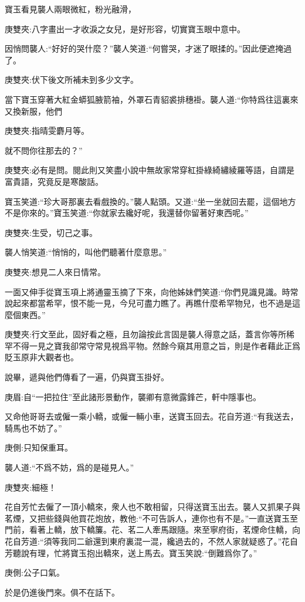 \begin{parag}
    寶玉看見襲人兩眼微紅，粉光融滑，\begin{note}庚雙夾:八字畫出一才收淚之女兒，是好形容，切實寶玉眼中意中。\end{note}因悄問襲人:“好好的哭什麼？”襲人笑道:“何嘗哭，才迷了眼揉的。”因此便遮掩過了。\begin{note}庚雙夾:伏下後文所補未到多少文字。\end{note}當下寶玉穿著大紅金蟒狐腋箭袖，外罩石青貂裘排穗褂。襲人道:“你特爲往這裏來又換新服，他們\begin{note}庚雙夾:指晴雯麝月等。\end{note}就不問你往那去的？”\begin{note}庚雙夾:必有是問。閱此則又笑盡小說中無故家常穿紅掛綠綺繡綾羅等語，自謂是富貴語，究竟反是寒酸話。\end{note}寶玉笑道:“珍大哥那裏去看戲換的。”襲人點頭。又道:“坐一坐就回去罷，這個地方不是你來的。”寶玉笑道:“你就家去纔好呢，我還替你留著好東西呢。”\begin{note}庚雙夾:生受，切己之事。\end{note}襲人悄笑道:“悄悄的，叫他們聽著什麼意思。”\begin{note}庚雙夾:想見二人來日情常。\end{note}一面又伸手從寶玉項上將通靈玉摘了下來，向他姊妹們笑道:“你們見識見識。時常說起來都當希罕，恨不能一見，今兒可盡力瞧了。再瞧什麼希罕物兒，也不過是這麼個東西。”\begin{note}庚雙夾:行文至此，固好看之極，且勿論按此言固是襲人得意之話，蓋言你等所稀罕不得一見之寶我卻常守常見視爲平物。然餘今窺其用意之旨，則是作者藉此正爲貶玉原非大觀者也。\end{note}說畢，遞與他們傳看了一遍，仍與寶玉掛好。\begin{note}庚眉:自“一把拉住”至此諸形景動作，襲卿有意微露鋒芒，軒中隱事也。\end{note}又命他哥哥去或僱一乘小轎，或僱一輛小車，送寶玉回去。花自芳道:“有我送去，騎馬也不妨了。”\begin{note}庚側:只知保重耳。\end{note}襲人道:“不爲不妨，爲的是碰見人。”\begin{note}庚雙夾:細極！\end{note}
\end{parag}


\begin{parag}
    花自芳忙去僱了一頂小轎來，衆人也不敢相留，只得送寶玉出去。襲人又抓果子與茗煙，又把些錢與他買花炮放，教他:“不可告訴人，連你也有不是。”一直送寶玉至門前，看著上轎，放下轎簾。花、茗二人牽馬跟隨。來至寧府街，茗煙命住轎，向花自芳道:“須等我同二爺還到東府裏混一混，纔過去的，不然人家就疑惑了。”花自芳聽說有理，忙將寶玉抱出轎來，送上馬去。寶玉笑說:“倒難爲你了。”\begin{note}庚側:公子口氣。\end{note}於是仍進後門來。俱不在話下。
\end{parag}


